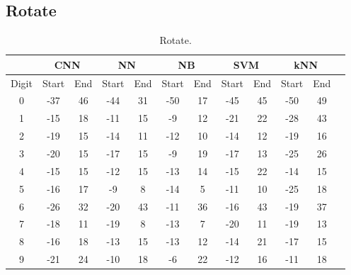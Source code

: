 \subsection{Rotate}
\begin{table}[ht]
\centering
\begin{tabular}{|c|c|c|c|c|c|c|c|c|c|c|c|}
\hline
 & \multicolumn{2}{c}{\textbf{CNN}} &  \multicolumn{2}{|c|}{\textbf{NN}} &\multicolumn{2}{c}{\textbf{NB}} & \multicolumn{2}{|c|}{\textbf{SVM}} & \multicolumn{2}{c|}{\textbf{kNN}} \\
\hline
Digit  &   Start & End & Start & End & Start & End & Start & End & Start & End \\
\hline
0  &   -37&46 & -44&31 & -50&17 & -45&45 & -50&49 \\
\hline
1 &   -15&18 & -11&15 & -9&12 & -21&22 & -28&43  \\
\hline
2  &   -19&15 & -14&11 & -12&10 & -14&12 & -19&16  \\
\hline
3  &   -20&15 & -17&15 & -9&19 & -17&13 & -25&26  \\
\hline
4  &   -15&15 & -12&15 & -13&14 & -15&22 & -14&15 \\
\hline
5  &   -16&17 & -9&8 & -14&5 & -11&10 & -25&18  \\
\hline
6  &   -26&32 & -20&43 & -11&36 & -16&43 & -19&37 \\
\hline
7  &   -18&11 & -19&8 & -13&7 & -20&11 & -19&13 \\
\hline
8  &   -16&18 & -13&15 & -13&12 & -14&21 & -17&15 \\
\hline
9  &   -21&24 & -10&18 & -6&22 & -12&16 & -11&18 \\ 
\hline
\end{tabular}
\caption{Rotate.}
\label{tbl:test-file-format}
\end{table}

\rotate
    

